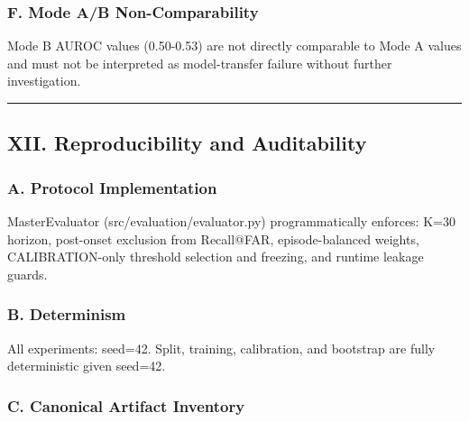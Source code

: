 \documentclass[
]{article}
\begin{document}
\subsubsection{F. Mode A/B
Non-Comparability}\label{f.-mode-ab-non-comparability}

Mode B AUROC values (0.50-0.53) are not directly comparable to Mode A
values and must not be interpreted as model-transfer failure without
further investigation.

\begin{center}\rule{0.5\linewidth}{0.5pt}\end{center}

\subsection{XII. Reproducibility and
Auditability}\label{xii.-reproducibility-and-auditability}

\subsubsection{A. Protocol
Implementation}\label{a.-protocol-implementation}

MasterEvaluator (src/evaluation/evaluator.py) programmatically enforces:
K=30 horizon, post-onset exclusion from Recall@FAR, episode-balanced
weights, CALIBRATION-only threshold selection and freezing, and runtime
leakage guards.

\subsubsection{B. Determinism}\label{b.-determinism}

All experiments: seed=42. Split, training, calibration, and bootstrap
are fully deterministic given seed=42.

\subsubsection{C. Canonical Artifact
Inventory}\label{c.-canonical-artifact-inventory}
\end{document}

